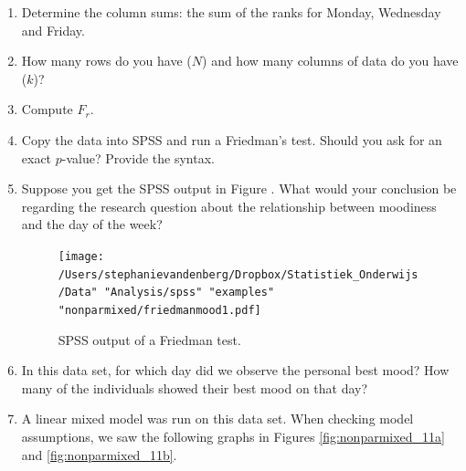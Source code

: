 \documentclass[]{report}\usepackage[]{graphicx}\usepackage[]{color}
\newenvironment{knitrout}{}{} %
\begin{document}
\begin{enumerate}
\begin{tabular}{llrrrr}
  & \dots & \dots  & \dots & \dots  & \dots  \\
  & \dots & \dots  & \dots & \dots  & \dots  \\
  & \dots & \dots  & \dots & \dots  & \dots  \\
  & \dots & \dots  & \dots & \dots  & \dots  \\
  & \dots & \dots  & \dots & \dots  & \dots  \\
  & \dots & \dots  & \dots & \dots  & \dots  \\
 \end{tabular}
\\
\\
\item Determine the column sums: the sum of the ranks for Monday, Wednesday and Friday.
\item How many rows do you have ($N$) and how many columns of data do you have ($k$)?
\item Compute $F_r$.
\item Copy the data into SPSS and run a Friedman's test. Should you ask for an exact $p$-value? Provide the syntax.
\item Suppose you get the SPSS output in Figure \label{ref:friedmanmood1}. What would your conclusion be regarding the research question about the relationship between moodiness and the day of the week?

\begin{figure}[h]
    \begin{center}
       \texttt{[image: /Users/stephanievandenberg/Dropbox/Statistiek\_Onderwijs/Data" "Analysis/spss" "examples" "nonparmixed/friedmanmood1.pdf]}
    \end{center}
    \caption{SPSS output of a Friedman test.}
    \label{fig:friedmanmood1}
\end{figure}

\item
In this data set, for which day did we observe the personal best mood? How many of the individuals showed their best mood on that day?


\item
A linear mixed model was run on this data set. When checking model assumptions, we saw the following graphs in Figures \ref{fig:nonparmixed_11a} and \ref{fig:nonparmixed_11b}.

\begin{knitrout}
\color{fgcolor}\begin{figure}


\end{figure}
\end{knitrout}
\end{enumerate}
\end{document}
